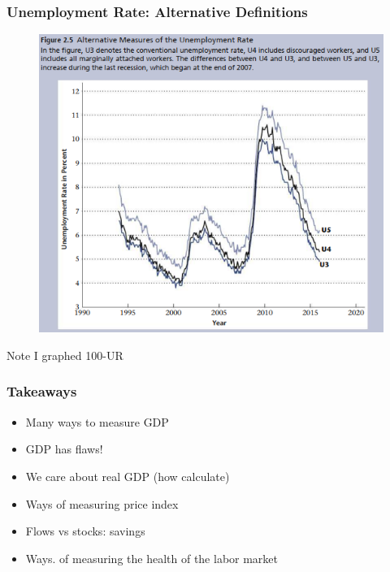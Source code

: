 \documentclass{beamer}
\begin{document}
\begin{frame}
\frametitle[alignment=center]{Unemployment Rate: Alternative Definitions}
\begin{figure}
\includegraphics[scale=0.5]{Figures/W_Fig_2pt5.png}
\end{figure}
Note I graphed 100-UR
\end{frame}




\begin{frame}
\frametitle[alignment=center]{Takeaways}
\begin{itemize}
\item Many ways to measure GDP
\bigskip
\item GDP has flaws!
\bigskip
\item We care about real GDP (how calculate)
\bigskip
\item Ways of measuring price index
\bigskip
\item Flows vs stocks: savings
\bigskip
\item  Ways. of measuring the health of the labor market
\end{itemize}
\end{frame}
\end{document}
